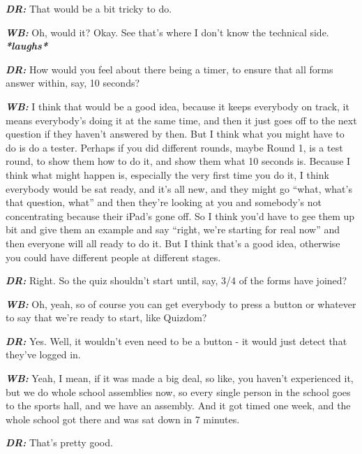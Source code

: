 \textit{\textbf{DR:}} That would be a bit tricky to do.

\textit{\textbf{WB:}} Oh, would it? Okay. See that's where I don't know the technical side. \textit{\textbf{*laughs*}}

\textit{\textbf{DR:}} How would you feel about there being a timer, to ensure that all forms answer within, say, 10 seconds?

\textit{\textbf{WB:}} I think that would be a good idea, because it keeps everybody on track, it means everybody's doing it at the same time, and then it just goes off to the next question if they haven't answered by then. But I think what you might have to do is do a tester. Perhaps if you did different rounds, maybe Round 1, is a test round, to show them how to do it, and show them what 10 seconds is. Because I think what might happen is, especially the very first time you do it, I think everybody would be sat ready, and it's all new, and they might go ``what, what's that question, what'' and then they're looking at you and somebody's not concentrating because their iPad's gone off. So I think you'd have to gee them up bit and give them an example and say ``right, we're starting for real now'' and then everyone will all ready to do it. But I think that's a good idea, otherwise you could have different people at different stages.

\textit{\textbf{DR:}} Right. So the quiz shouldn't start until, say, 3/4 of the forms have joined?

\textit{\textbf{WB:}} Oh, yeah, so of course you can get everybody to press a button or whatever to say that we're ready to start, like Quizdom?

\textit{\textbf{DR:}} Yes. Well, it wouldn't even need to be a button - it would just detect that they've logged in.

\textit{\textbf{WB:}} Yeah, I mean, if it was made a big deal, so like, you haven't experienced it, but we do whole school assemblies now, so every single person in the school goes to the sports hall, and we have an assembly. And it got timed one week, and the whole school got there and was sat down in 7 minutes.

\textit{\textbf{DR:}} That's pretty good.

